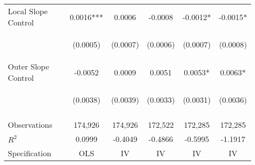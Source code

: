 \begin{tabular}{lccccc}
Local Slope Control & 0.0016*** & 0.0006 & -0.0008 & -0.0012* & -0.0015* \\
\vspace{4pt} & \begin{footnotesize}(0.0005)\end{footnotesize} & \begin{footnotesize}(0.0007)\end{footnotesize} & \begin{footnotesize}(0.0006)\end{footnotesize} & \begin{footnotesize}(0.0007)\end{footnotesize} & \begin{footnotesize}(0.0008)\end{footnotesize} \\
Outer Slope Control & -0.0052 & 0.0009 & 0.0051 & 0.0053* & 0.0063* \\
 & \begin{footnotesize}(0.0038)\end{footnotesize} & \begin{footnotesize}(0.0039)\end{footnotesize} & \begin{footnotesize}(0.0033)\end{footnotesize} & \begin{footnotesize}(0.0031)\end{footnotesize} & \begin{footnotesize}(0.0036)\end{footnotesize} \\
\vspace{4pt} & \begin{footnotesize}\end{footnotesize} & \begin{footnotesize}\end{footnotesize} & \begin{footnotesize}\end{footnotesize} & \begin{footnotesize}\end{footnotesize} & \begin{footnotesize}\end{footnotesize} \\
Observations & 174,926 & 174,926 & 172,522 & 172,285 & 172,285 \\
$R^2$ & 0.0999 & -0.4049 & -0.4866 & -0.5995 & -1.1917 \\
Specification & OLS & IV & IV & IV & IV \\

\end{tabular}
